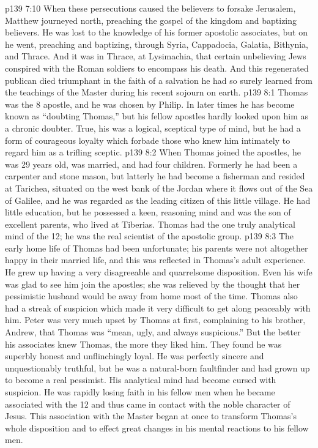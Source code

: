 \vs p139 7:10 \pc When these persecutions caused the believers to forsake Jerusalem, Matthew journeyed north, preaching the gospel of the kingdom and baptizing believers. He was lost to the knowledge of his former apostolic associates, but on he went, preaching and baptizing, through Syria, Cappadocia, Galatia, Bithynia, and Thrace. And it was in Thrace, at Lysimachia, that certain unbelieving Jews conspired with the Roman soldiers to encompass his death. And this regenerated publican died triumphant in the faith of a salvation he had so surely learned from the teachings of the Master during his recent sojourn on earth.
\vs p139 8:1 Thomas was the 8 apostle, and he was chosen by Philip. In later times he has become known as “doubting Thomas,” but his fellow apostles hardly looked upon him as a chronic doubter. True, his was a logical, sceptical type of mind, but he had a form of courageous loyalty which forbade those who knew him intimately to regard him as a trifling sceptic.
\vs p139 8:2 When Thomas joined the apostles, he was 29 years old, was married, and had four children. Formerly he had been a carpenter and stone mason, but latterly he had become a fisherman and resided at Tarichea, situated on the west bank of the Jordan where it flows out of the Sea of Galilee, and he was regarded as the leading citizen of this little village. He had little education, but he possessed a keen, reasoning mind and was the son of excellent parents, who lived at Tiberias. Thomas had the one truly analytical mind of the 12; he was the real scientist of the apostolic group.
\vs p139 8:3 The early home life of Thomas had been unfortunate; his parents were not altogether happy in their married life, and this was reflected in Thomas’s adult experience. He grew up having a very disagreeable and quarrelsome disposition. Even his wife was glad to see him join the apostles; she was relieved by the thought that her pessimistic husband would be away from home most of the time. Thomas also had a streak of suspicion which made it very difficult to get along peaceably with him. Peter was very much upset by Thomas at first, complaining to his brother, Andrew, that Thomas was “mean, ugly, and always suspicious.” But the better his associates knew Thomas, the more they liked him. They found he was superbly honest and unflinchingly loyal. He was perfectly sincere and unquestionably truthful, but he was a natural\hyp{}born faultfinder and had grown up to become a real pessimist. His analytical mind had become cursed with suspicion. He was rapidly losing faith in his fellow men when he became associated with the 12 and thus came in contact with the noble character of Jesus. This association with the Master began at once to transform Thomas’s whole disposition and to effect great changes in his mental reactions to his fellow men.
